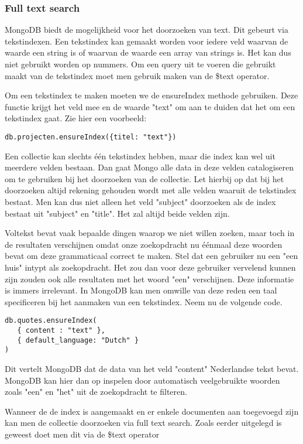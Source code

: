 \documentclass[a4paper,11pt]{article}
\begin{document}
\subsubsection{Full text search}
MongoDB biedt de mogelijkheid voor het doorzoeken van text.\cite{mongodb:textindex} Dit gebeurt via tekstindexen. Een tekstindex kan gemaakt worden voor iedere veld waarvan de waarde een string is of waarvan de waarde een array van strings is. Het kan dus niet gebruikt worden op nummers. Om een query uit te voeren die gebruikt maakt van de tekstindex moet men gebruik maken van de \$text operator.

Om een tekstindex te maken moeten we de ensureIndex methode gebruiken. Deze functie krijgt het veld mee en de waarde "text" om aan te duiden dat het om een tekstindex gaat. Zie hier een voorbeeld:

\begin{lstlisting}
db.projecten.ensureIndex({titel: "text"})
\end{lstlisting}
Een collectie kan slechts één tekstindex hebben, maar die index kan wel uit meerdere velden bestaan. Dan gaat Mongo alle data in deze velden catalogiseren om te gebruiken bij het doorzoeken van de collectie. Let hierbij op dat bij het doorzoeken altijd rekening gehouden wordt met alle velden waaruit de tekstindex bestaat. Men kan dus niet alleen het veld "subject" doorzoeken als de index bestaat uit "subject" en "title". Het zal altijd beide velden zijn.

Voltekst bevat vaak bepaalde dingen waarop we niet willen zoeken, maar toch in de resultaten verschijnen omdat onze zoekopdracht nu éénmaal deze woorden bevat om deze grammaticaal correct te maken. Stel dat een gebruiker nu een "een huis" intypt als zoekopdracht. Het zou dan voor deze gebruiker vervelend kunnen zijn zouden ook alle resultaten met het woord "een" verschijnen. Deze informatie is immers irrelevant. In MongoDB kan men omwille van deze reden een taal specificeren bij het aanmaken van een tekstindex. Neem nu de volgende code.
\begin{lstlisting}
db.quotes.ensureIndex(
   { content : "text" },
   { default_language: "Dutch" }
)
\end{lstlisting}
Dit vertelt MongoDB dat de data van het veld "content" Nederlandse tekst bevat. MongoDB kan hier dan op inspelen door automatisch veelgebruikte woorden zoals "een" en "het" uit de zoekopdracht te filteren.

Wanneer de de index is aangemaakt en er enkele documenten aan toegevoegd zijn kan men de collectie doorzoeken via full text search. Zoals eerder uitgelegd is geweest doet men dit via de \$text operator
\end{document}
